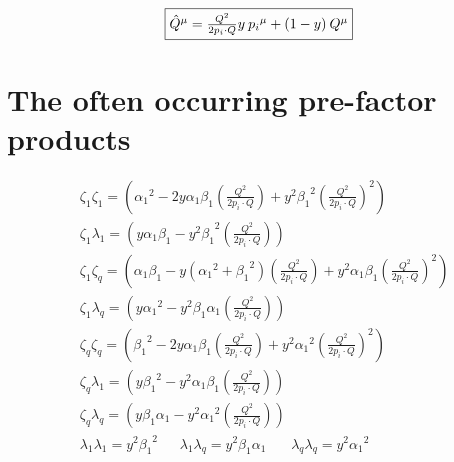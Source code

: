 \begin{equation}
	\begin{aligned}
		\fbox{$  {\hat{{Q}}}^{\mu}= \frac{Q^2}{2p_i \cdot Q}y \:{p_i}^{\mu}+(1-y)\:{Q}^{\mu} $}
    \end{aligned}
\end{equation}

\section*{The often occurring pre-factor products}

\begin{equation}
	\begin{split}
	&\zeta_1\zeta_1=({\alpha_1}^2 -2y\alpha_1 \beta_1(\frac{Q^2}{2p_i \cdot Q})+y^2{\beta_1}^2(\frac{Q^2}{2p_i \cdot Q})^2)\\
	&\zeta_1\lambda_1=(y\alpha_1\beta_1 -{y^2\beta_1}^2(\frac{Q^2}{2p_i \cdot Q}))\\
	&\zeta_1\zeta_q=(\alpha_1\beta_1-y({\alpha_1}^2+{\beta_1}^2) (\frac{Q^2}{2p_i \cdot Q})+y^2{\alpha_1}{\beta_1}(\frac{Q^2}{2p_i \cdot Q})^2)\\
	&\zeta_1\lambda_q=(y{\alpha_1}^2 -y^2\beta_1\alpha_1(\frac{Q^2}{2p_i \cdot Q}))\\
	&\zeta_q\zeta_q=	({\beta_1}^2 -2y\alpha_1\beta_1 (\frac{Q^2}{2p_i \cdot Q})+ y^2{\alpha_1}^2 (\frac{Q^2}{2p_i \cdot Q})^2) \\
	&\zeta_q\lambda_1=(y{\beta_1}^2 -y^2\alpha_1 \beta_1(\frac{Q^2}{2p_i \cdot Q}))\\
	&\zeta_q\lambda_q=(y\beta_1\alpha_1 -y^2{\alpha_1}^2(\frac{Q^2}{2p_i \cdot Q}))\\
	&\lambda_1\lambda_1=y^2{\beta_1}^2 \:\:\:\:\:\:\:
	\lambda_1\lambda_q=y^2\beta_1\alpha_1\:\:\:\:\:\:\:\:
	\lambda_q\lambda_q=y^2{\alpha_1}^2\\
    \end{split}
\end{equation}